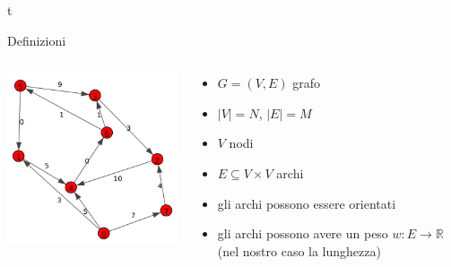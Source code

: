 t \documentclass{beamer}
\theoremstyle{plain}
\theoremstyle{definition}
\theoremstyle{remark}
\newcommand{\abs}[1]{\left|#1\right|}
\begin{document}
\begin{frame}{Definizioni}
  \begin{columns}
    \begin{column}{0.40\textwidth}
      \includegraphics[width=\textwidth]{directgraph}
    \end{column}
    \begin{column}{0.58\textwidth}
      \begin{itemize}
      \item $G = (V,E)$ grafo
      \item $\abs{V} = N$, $\abs{E} = M$
      \item $V$ nodi
      \item $E \subseteq V\times V$ archi
      \item gli archi possono essere orientati
      \item gli archi possono avere un peso $w: E \to \mathbb{R}$ (nel
        nostro caso la lunghezza)
      \end{itemize}
    \end{column}
  \end{columns}
\end{frame}
\end{document}
